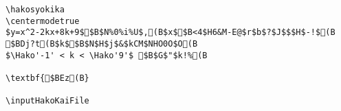 \begin{verbatim}
\hakosyokika
\centermodetrue
$y=x^2-2kx+8k+9$$B$N%0%i%U$,(B$x$$B<4$H6&M-E@$r$b$?$J$$$H$-!$(B
$BDj?t(B$k$$B$N$H$j$&$kCM$NHO0O$O(B
$\Hako'-1' < k < \Hako'9'$ $B$G$"$k!%(B

\textbf{$BEz(B}

\inputHakoKaiFile
\end{verbatim}
